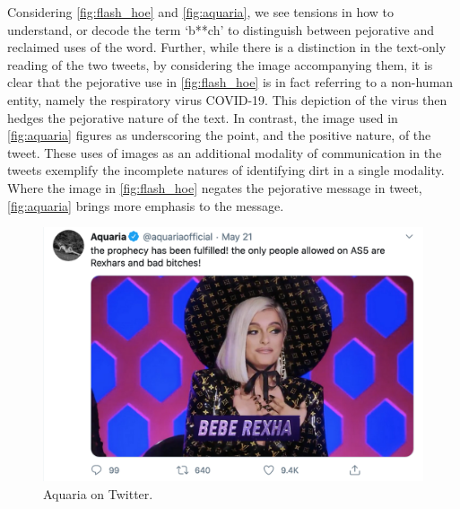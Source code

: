 Considering \autoref{fig:flash_hoe} and \autoref{fig:aquaria}, we see tensions in how to understand, or decode the term `b**ch' to distinguish between pejorative and reclaimed uses of the word. Further, while there is a distinction in the text-only reading of the two tweets, by considering the image accompanying them, it is clear that the pejorative use in \autoref{fig:flash_hoe} is in fact referring to a non-human entity, namely the respiratory virus COVID-19. This depiction of the virus then hedges the pejorative nature of the text. In contrast, the image used in \autoref{fig:aquaria} figures as underscoring the point, and the positive nature, of the tweet. These uses of images as an additional modality of communication in the tweets exemplify the incomplete natures of identifying dirt in a single modality. Where the image in \autoref{fig:flash_hoe} negates the pejorative message in tweet, \autoref{fig:aquaria} brings more emphasis to the message.

\begin{figure}[!ht]
  \centering
  \includegraphics[scale=0.5]{aquaria.png}
  \caption{Aquaria on Twitter.}
  \label{fig:aquaria}
\end{figure}


